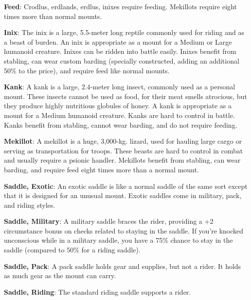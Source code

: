 \textbf{Feed}: Crodlus, erdlands, erdlus, inixes require feeding. Mekillots require eight times more than normal mounts.

\textbf{Inix}: The inix is a large, 5.5-meter long reptile commonly used for riding and as a beast of burden. An inix is appropriate as a mount for a Medium or Large humanoid creature. Inixes can be ridden into battle easily. Inixes benefit from stabling, can wear custom barding (specially constructed, adding an additional 50\% to the price), and require feed like normal mounts.

\textbf{Kank}: A kank is a large, 2.4-meter long insect, commonly used as a personal mount. These insects cannot be used as food, for their meat smells atrocious, but they produce highly nutritious globules of honey. A kank is appropriate as a mount for a Medium humanoid creature. Kanks are hard to control in battle. Kanks benefit from stabling, cannot wear barding, and do not require feeding.

\textbf{Mekillot}: A mekillot is a huge, 3,000-kg. lizard, used for hauling large cargo or serving as transportation for troops. These beasts are hard to control in combat and usually require a psionic handler. Mekillots benefit from stabling, can wear barding, and require feed eight times more than a normal mount.

\textbf{Saddle, Exotic}: An exotic saddle is like a normal saddle of the same sort except that it is designed for an unusual mount. Exotic saddles come in military, pack, and riding styles.

\textbf{Saddle, Military}: A military saddle braces the rider, providing a +2 circumstance bonus on  checks related to staying in the saddle. If you're knocked unconscious while in a military saddle, you have a 75\% chance to stay in the saddle (compared to 50\% for a riding saddle).

\textbf{Saddle, Pack}: A pack saddle holds gear and supplies, but not a rider. It holds as much gear as the mount can carry.

\textbf{Saddle, Riding}: The standard riding saddle supports a rider.